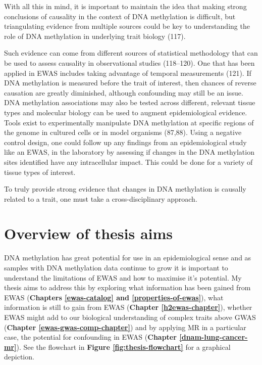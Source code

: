 \documentclass[11pt,oneside]{bristolthesis}
\begin{document}
With all this in mind, it is important to maintain the idea that making strong conclusions of causality in the context of DNA methylation is difficult, but triangulating evidence from multiple sources could be key to understanding the role of DNA methylation in underlying trait biology (117).

Such evidence can come from different sources of statistical methodology that can be used to assess causality in observational studies (118--120). One that has been applied in EWAS includes taking advantage of temporal measurements (121). If DNA methylation is measured before the trait of interest, then chances of reverse causation are greatly diminished, although confounding may still be an issue. DNA methylation associations may also be tested across different, relevant tissue types and molecular biology can be used to augment epidemiological evidence. Tools exist to experimentally manipulate DNA methylation at specific regions of the genome in cultured cells or in model organisms (87,88). Using a negative control design, one could follow up any findings from an epidemiological study like an EWAS, in the laboratory by assessing if changes in the DNA methylation sites identified have any intracellular impact. This could be done for a variety of tissue types of interest.

To truly provide strong evidence that changes in DNA methylation is causally related to a trait, one must take a cross-disciplinary approach.

\hypertarget{overview-of-thesis-aims}{%
\section{Overview of thesis aims}\label{overview-of-thesis-aims}}

DNA methylation has great potential for use in an epidemiological sense and as samples with DNA methylation data continue to grow it is important to understand the limitations of EWAS and how to maximise it's potential. My thesis aims to address this by exploring what information has been gained from EWAS (\textbf{Chapters \ref{ewas-catalog} and \ref{properties-of-ewas}}), what information is still to gain from EWAS (\textbf{Chapter \ref{h2ewas-chapter}}), whether EWAS might add to our biological understanding of complex traits above GWAS (\textbf{Chapter \ref{ewas-gwas-comp-chapter}}) and by applying MR in a particular case, the potential for confounding in EWAS (\textbf{Chapter \ref{dnam-lung-cancer-mr}}). See the flowchart in \textbf{Figure \ref{fig:thesis-flowchart}} for a graphical depiction.
\end{document}
